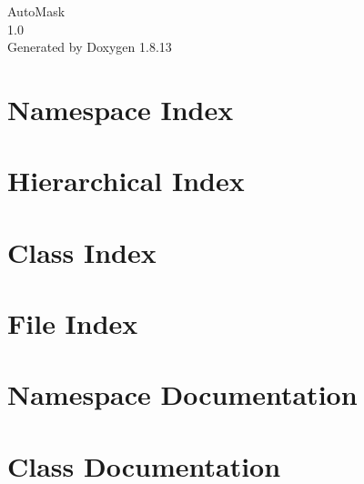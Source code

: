 \documentclass[twoside]{book}
\newcommand{\+}{\discretionary{\mbox{\scriptsize$\hookleftarrow$}}{}{}}
\newcommand{\clearemptydoublepage}{%
  \newpage{\pagestyle{empty}\cleardoublepage}%
}
\begin{document}
\hypersetup{pageanchor=false,
             bookmarksnumbered=true,
             pdfencoding=unicode
            }
\begin{titlepage}
\vspace*{7cm}
\begin{center}%
{\Large Auto\+Mask \\[1ex]\large 1.\+0 }\\
\vspace*{1cm}
{\large Generated by Doxygen 1.8.13}\\
\end{center}
\end{titlepage}
\clearemptydoublepage
{}
\tableofcontents
\clearemptydoublepage
{}
\hypersetup{pageanchor=true}

\chapter{Namespace Index}

\chapter{Hierarchical Index}

\chapter{Class Index}

\chapter{File Index}

\chapter{Namespace Documentation}


















\chapter{Class Documentation}














\end{document}
